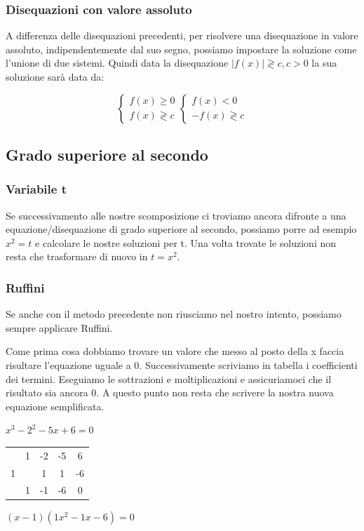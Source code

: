 \subsubsection*{Disequazioni con valore assoluto}
A differenza delle disequazioni precedenti, per risolvere una disequazione in valore assoluto, indipendentemente dal suo segno, possiamo impostare la soluzione come l'unione di due sistemi. Quindi data la disequazione $|f(x)|\gtrless c, c>0$ la sua soluzione sarà data da:

\begin{center}
    \[
  \begin{cases}
    f(x)\geq 0 \\
    f(x)\gtrless c
    
  \end{cases}
  \begin{cases}
       f(x)<0\\
       -f(x)\gtrless c
  \end{cases}
  \]
\end{center}
          
\subsection*{Grado superiore al secondo}
\subsubsection*{Variabile t}
Se successivamento alle nostre scomposizione ci troviamo ancora difronte a una equazione/disequazione di grado superiore al secondo, possiamo porre ad esempio $x^2=t$ e calcolare le nostre soluzioni per t.
Una volta trovate le soluzioni non resta che trasformare di nuovo in $t=x^2$.

\subsubsection*{Ruffini}
Se anche con il metodo precedente non riusciamo nel nostro intento, possiamo sempre applicare Ruffini.

Come prima cosa dobbiamo trovare un valore che messo al posto della x faccia risultare l'equazione uguale a 0. Successivamente scriviamo in tabella i coefficienti dei termini. Eseguiamo le sottrazioni e moltiplicazioni e assicuriamoci che il risultato sia ancora 0.
A questo punto non resta che scrivere la nostra nuova equazione semplificata.
\begin{example}
    $x^3-2^2-5x+6=0$
    \begin{center}
        \begin{tabular}{c|ccc|c}
            &1&-2&-5&6\\
            1&&1&1&-6\\\hline
            &1&-1&-6&0\\
        \end{tabular}
    \end{center}
    $(x-1)(1x^2-1x-6)=0$
\end{example}


